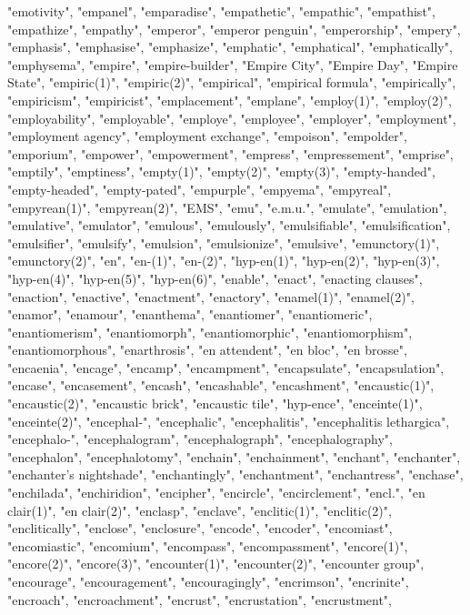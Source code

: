 "emotivity",
"empanel",
"emparadise",
"empathetic",
"empathic",
"empathist",
"empathize",
"empathy",
"emperor",
"emperor penguin",
"emperorship",
"empery",
"emphasis",
"emphasise",
"emphasize",
"emphatic",
"emphatical",
"emphatically",
"emphysema",
"empire",
"empire-builder",
"Empire City",
"Empire Day",
"Empire State",
"empiric(1)",
"empiric(2)",
"empirical",
"empirical formula",
"empirically",
"empiricism",
"empiricist",
"emplacement",
"emplane",
"employ(1)",
"employ(2)",
"employability",
"employable",
"employe",
"employee",
"employer",
"employment",
"employment agency",
"employment exchange",
"empoison",
"empolder",
"emporium",
"empower",
"empowerment",
"empress",
"empressement",
"emprise",
"emptily",
"emptiness",
"empty(1)",
"empty(2)",
"empty(3)",
"empty-handed",
"empty-headed",
"empty-pated",
"empurple",
"empyema",
"empyreal",
"empyrean(1)",
"empyrean(2)",
"EMS",
"emu",
"e.m.u.",
"emulate",
"emulation",
"emulative",
"emulator",
"emulous",
"emulously",
"emulsifiable",
"emulsification",
"emulsifier",
"emulsify",
"emulsion",
"emulsionize",
"emulsive",
"emunctory(1)",
"emunctory(2)",
"en",
"en-(1)",
"en-(2)",
"hyp-en(1)",
"hyp-en(2)",
"hyp-en(3)",
"hyp-en(4)",
"hyp-en(5)",
"hyp-en(6)",
"enable",
"enact",
"enacting clauses",
"enaction",
"enactive",
"enactment",
"enactory",
"enamel(1)",
"enamel(2)",
"enamor",
"enamour",
"enanthema",
"enantiomer",
"enantiomeric",
"enantiomerism",
"enantiomorph",
"enantiomorphic",
"enantiomorphism",
"enantiomorphous",
"enarthrosis",
"en attendent",
"en bloc",
"en brosse",
"encaenia",
"encage",
"encamp",
"encampment",
"encapsulate",
"encapsulation",
"encase",
"encasement",
"encash",
"encashable",
"encashment",
"encaustic(1)",
"encaustic(2)",
"encaustic brick",
"encaustic tile",
"hyp-ence",
"enceinte(1)",
"enceinte(2)",
"encephal-",
"encephalic",
"encephalitis",
"encephalitis lethargica",
"encephalo-",
"encephalogram",
"encephalograph",
"encephalography",
"encephalon",
"encephalotomy",
"enchain",
"enchainment",
"enchant",
"enchanter",
"enchanter's nightshade",
"enchantingly",
"enchantment",
"enchantress",
"enchase",
"enchilada",
"enchiridion",
"encipher",
"encircle",
"encirclement",
"encl.",
"en clair(1)",
"en clair(2)",
"enclasp",
"enclave",
"enclitic(1)",
"enclitic(2)",
"enclitically",
"enclose",
"enclosure",
"encode",
"encoder",
"encomiast",
"encomiastic",
"encomium",
"encompass",
"encompassment",
"encore(1)",
"encore(2)",
"encore(3)",
"encounter(1)",
"encounter(2)",
"encounter group",
"encourage",
"encouragement",
"encouragingly",
"encrimson",
"encrinite",
"encroach",
"encroachment",
"encrust",
"encrustation",
"encrustment",
